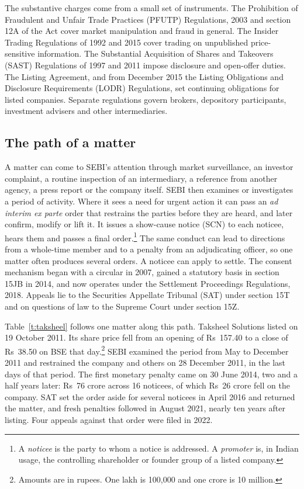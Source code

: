\documentclass[letterpaper,11pt,leqno]{article}
\begin{document}
The substantive charges come from a small set of instruments. The Prohibition of Fraudulent and Unfair Trade Practices (PFUTP) Regulations, 2003 and section 12A of the Act cover market manipulation and fraud in general. The Insider Trading Regulations of 1992 and 2015 cover trading on unpublished price-sensitive information. The Substantial Acquisition of Shares and Takeovers (SAST) Regulations of 1997 and 2011 impose disclosure and open-offer duties. The Listing Agreement, and from December 2015 the Listing Obligations and Disclosure Requirements (LODR) Regulations, set continuing obligations for listed companies. Separate regulations govern brokers, depository participants, investment advisers and other intermediaries.

\subsection{The path of a matter}\label{s:path}

A matter can come to SEBI's attention through market surveillance, an investor complaint, a routine inspection of an intermediary, a reference from another agency, a press report or the company itself. SEBI then examines or investigates a period of activity. Where it sees a need for urgent action it can pass an \emph{ad interim ex parte} order that restrains the parties before they are heard, and later confirm, modify or lift it. It issues a show-cause notice (SCN) to each noticee, hears them and passes a final order.\footnote{A \emph{noticee} is the party to whom a notice is addressed. A \emph{promoter} is, in Indian usage, the controlling shareholder or founder group of a listed company.} The same conduct can lead to directions from a whole-time member and to a penalty from an adjudicating officer, so one matter often produces several orders. A noticee can apply to settle. The consent mechanism began with a circular in 2007, gained a statutory basis in section 15JB in 2014, and now operates under the Settlement Proceedings Regulations, 2018. Appeals lie to the Securities Appellate Tribunal (SAT) under section 15T and on questions of law to the Supreme Court under section 15Z.

Table~\ref{t:taksheel} follows one matter along this path. Taksheel Solutions listed on 19 October 2011. Its share price fell from an opening of Rs~157.40 to a close of Rs~38.50 on BSE that day.\footnote{Amounts are in rupees. One lakh is 100,000 and one crore is 10 million.} SEBI examined the period from May to December 2011 and restrained the company and others on 28 December 2011, in the last days of that period. The first monetary penalty came on 30 June 2014, two and a half years later: Rs~76 crore across 16 noticees, of which Rs~26 crore fell on the company. SAT set the order aside for several noticees in April 2016 and returned the matter, and fresh penalties followed in August 2021, nearly ten years after listing. Four appeals against that order were filed in 2022.
\end{document}
